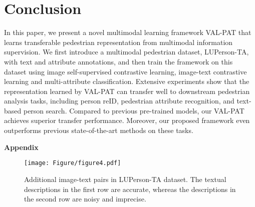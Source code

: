 \documentclass[final]{cvpr}
\begin{document}
\vspace{-2mm}
\section{Conclusion}
In this paper, we present a novel multimodal learning framework VAL-PAT that learns transferable pedestrian representation from multimodal information supervision.
We first introduce a multimodal pedestrian dataset, LUPerson-TA, with text and attribute annotations, and then train the framework on this dataset using image self-supervised contrastive learning, image-text contrastive learning and multi-attribute classification.
Extensive experiments show that the representation learned by VAL-PAT can transfer well to downstream pedestrian analysis tasks, including person reID, pedestrian attribute recognition, and text-based person search.
Compared to previous pre-trained models, our VAL-PAT achieves superior transfer performance.
Moreover, our proposed framework even outperforms previous state-of-the-art methods on these tasks.






{\small


}

\newpage
\appendix
\noindent\textbf{\Large Appendix}

\begin{figure*}[tp]
	\centering
	\texttt{[image: Figure/figure4.pdf]}
	\caption{
		Additional image-text pairs in LUPerson-TA dataset.
		The textual descriptions in the first row are accurate, whereas the descriptions in the second row are noisy and imprecise.
	}
\label{app:fig1} 
\end{figure*}
\end{document}
